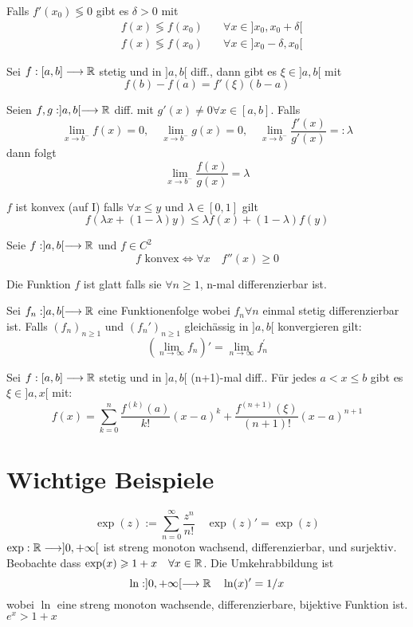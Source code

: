 \Satz Falls $f'(x_0) \lessgtr 0$ gibt es $\delta > 0$ mit
\begin{align*}
	&f(x) \lessgtr f(x_0) \quad &\forall x \in ]x_0, x_0+\delta[ \\
	&f(x) \lessgtr f(x_0) \quad &\forall x \in ]x_0-\delta, x_0[ 
\end{align*}

 Sei $f:[a,b] \longrightarrow \mathbb{R}$ stetig und in $]a,b[$ diff., dann gibt es $\xi \in ]a,b[$ mit
$$f(b)-f(a) = f'(\xi)(b-a)$$

\Satz[L'Hospital] Seien $f,g: ]a,b[ \longrightarrow \mathbb{R}$ diff. mit $g'(x) \neq 0 \forall x \in [a,b]$. Falls
$$\lim _{x \rightarrow b^{-}} f(x)=0, \quad \lim _{x \rightarrow b^{-}} g(x)=0, \quad \lim _{x \rightarrow b^{-}} \frac{f'(x)}{g'(x)}=:\lambda$$
dann folgt
$$\lim _{x \rightarrow b^{-}} \frac{f(x)}{g(x)}=\lambda$$


\Def[Konvex] $f$ ist konvex (auf I) falls $\forall x \leq y$ und $\lambda \in [0,1]$ gilt
$$f(\lambda x+(1-\lambda) y) \leqslant \lambda f(x)+(1-\lambda) f(y)$$

\Lemma[Konvex] Seie $f: ]a,b[ \longrightarrow \mathbb{R}$ und $f \in C^2$ 
$$ f \text{ konvex} \iff \forall x \quad f''(x) \geq 0$$

\Def[Glatt] Die Funktion $f$ ist glatt falls sie $\forall n \geq 1$, n-mal differenzierbar ist.

\Satz[Funktionenfolgen] Sei $f_n:]a,b[ \longrightarrow \mathbb{R}$ eine Funktionenfolge wobei $f_n \forall n$ einmal stetig differenzierbar ist. Falls $(f_n)_{n\geqslant1}$ und $(f_n')_{n\geqslant1}$ gleichässig in $]a,b[$ konvergieren gilt:
$$(\lim _{n \rightarrow \infty} f_{n})'=\lim _{n \rightarrow \infty} f_{n}^{\prime}$$

 Sei $f:[a,b] \longrightarrow \mathbb{R}$ stetig und in $]a,b[$ (n+1)-mal diff.. Für jedes $a<x\leqslant b$ gibt es $\xi \in ]a,x[$ mit:
$$f(x)=\sum_{k=0}^{n} \frac{f^{(k)}(a)}{k !}(x-a)^{k}+\frac{f^{(n+1)}(\xi)}{(n+1) !}(x-a)^{n+1}$$


\section{Wichtige Beispiele}
\Bsp[Exponentialfunktion]
$$\exp (z):=\sum_{n=0}^{\infty} \frac{z^{n}}{n !} \quad \exp (z)' = \exp(z)$$
$\exp : \mathbb{R} \longrightarrow] 0,+\infty[$ ist streng monoton wachsend, differenzierbar, und surjektiv. Beobachte dass $\exp (x) \geqslant 1+x \quad \forall x \in \mathbb{R}$.
Die Umkehrabbildung ist 
$$\ln :] 0,+\infty[\longrightarrow \mathbb{R} \quad \ln (x)' = 1/x$$
wobei $\ln$ eine streng monoton wachsende, differenzierbare, bijektive Funktion ist. \\
\Lemma $e^x > 1+x$

